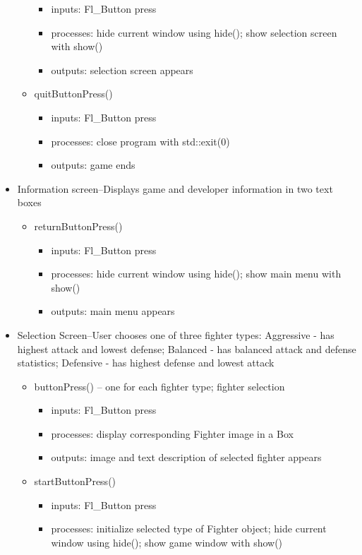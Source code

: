 \documentclass{article}
\begin{document}
\begin{itemize}
\begin{itemize}
\begin{itemize}
\item inputs: Fl\_Button press
\item processes: hide current window using hide(); show selection screen with show()
\item outputs: selection screen appears
\end{itemize}
\item quitButtonPress()
\begin{itemize}
\item inputs: Fl\_Button press
\item processes: close program with std::exit(0)
\item outputs: game ends
\end{itemize}
\end{itemize}
\item Information screen--Displays game and developer information in two text boxes
\begin{itemize}
\item returnButtonPress()
\begin{itemize}
\item inputs: Fl\_Button press
\item processes: hide current window using hide(); show main menu with show()
\item outputs: main menu appears
\end{itemize}
\end{itemize}
\item Selection Screen--User chooses one of three fighter types: Aggressive - has highest attack and lowest defense; Balanced - has balanced attack and defense statistics; Defensive - has highest defense and lowest attack
\begin{itemize}
\item buttonPress() -- one for each fighter type; fighter selection
\begin{itemize}
\item inputs: Fl\_Button press
\item processes: display corresponding Fighter image in a Box
\item outputs: image and text description of selected fighter appears
\end{itemize}
\item startButtonPress()
\begin{itemize}
\item inputs: Fl\_Button press
\item processes: initialize selected type of Fighter object; hide current window using hide(); show game window with show()

\end{itemize}
\end{itemize}
\end{itemize}
\end{document}
